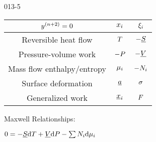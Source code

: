 \begin{mitframe}{013-5}

    

\begin{longtable}{ | c | c | c | } 
 \hline
 	$ y^{(n+2)}= \init$& $\conjcoor$ & $\conjcoortwo_{\state}$ \\ \hline
	Reversible heat flow & $\Temp$ & $-\uline{\entropy}$ \\ \hline 
	Pressure-volume work & $-\p$ & $-\uline{\vol}$  \\ \hline
 	Mass flow enthalpy/entropy& $\chempot_{\state}$ & $-\nummoles_{\state}$ \\ \hline   
	Surface deformation & $\totalsa$ & $\surftens$ \\ \hline   
    Generalized work & $\gendisp_{\state}$ & $\force$ \\ \hline
 
 
\end{longtable}

    
    
\begin{listone}
        
    \item Maxwell Relationships:
        
    \item $\init = -\uline{\entropy}\mathrm{d}\Temp + \uline{\vol}\mathrm{d}\p - \sum\nolimits\nummoles_{\state}\mathrm{d}\chempot_{\state}$

    
\end{listone}			

\end{mitframe}